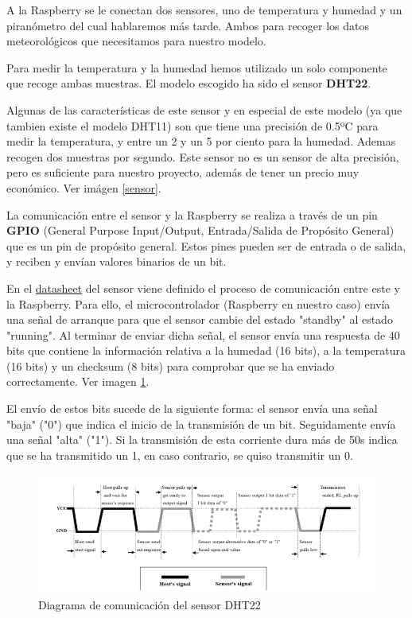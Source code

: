 A la Raspberry se le conectan dos sensores, uno de temperatura y humedad y un piranómetro del cual hablaremos más tarde. Ambos para recoger los datos meteorológicos que necesitamos para nuestro modelo.

Para medir la temperatura y la humedad hemos utilizado un solo componente que recoge ambas muestras. El modelo escogido ha sido el sensor \textbf{DHT22}.

Algunas de las características de este sensor y en especial de este modelo (ya que tambien existe el modelo DHT11) son que tiene una precisión de 0.5ºC para medir la temperatura, y entre un 2 y un 5 por ciento para la humedad. Ademas recogen dos muestras por segundo. Este sensor no es un sensor de alta precisión, pero es suficiente para nuestro proyecto, además de tener un precio muy económico. Ver imágen \ref{sensor}.

La comunicación entre el sensor y la Raspberry se realiza a través de un pin \textbf{GPIO} (General Purpose Input/Output, Entrada/Salida de Propósito General) que es un pin de propósito general. Estos pines pueden ser de entrada o de salida, y reciben y envían valores binarios de un bit.

En el \href{https://cdn-shop.adafruit.com/datasheets/Digital+humidity+and+temperature+sensor+AM2302.pdf}{datasheet} del sensor viene definido el proceso de comunicación entre este y la Raspberry. Para ello, el microcontrolador (Raspberry en nuestro caso) envía una señal de arranque para que el sensor cambie del estado "standby" al estado "running". Al terminar de enviar dicha señal, el sensor envía una respuesta de 40 bits que contiene la información relativa a la humedad (16 bits), a la temperatura (16 bits) y un checksum (8 bits) para comprobar que se ha enviado correctamente. Ver imagen \ref{DHT22comunication}.

El envío de estos bits sucede de la siguiente forma: el sensor envía una señal "baja" ("0") que indica el inicio de la transmisión de un bit. Seguidamente envía una señal "alta" ("1"). Si la transmisión de esta corriente dura más de 50\mu s indica que se ha transmitido un 1, en caso contrario, se quiso transmitir un 0.

\begin{figure}[htb]
	
	\begin{center}
		\includegraphics[width=15cm]{figures/DTH22comunicationdiagram.png}
		\caption{Diagrama de comunicación del sensor DHT22}
	\end{center}
	
	\label{DHT22comunication}
\end{figure} 

